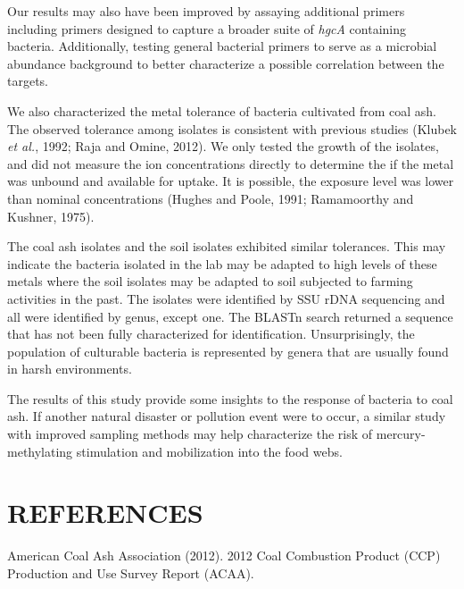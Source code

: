 \documentclass[ms, hidelinks]{uncgdissertationexp}
\theoremstyle{plain}
\theoremstyle{definition}
\theoremstyle{remark}
\begin{document}
Our results may also have been improved by assaying additional primers including primers designed to capture a broader suite of \emph{hgcA} containing bacteria. Additionally, testing general bacterial primers to serve as a microbial abundance background to better characterize a possible correlation between the targets.

We also characterized the metal tolerance of bacteria cultivated from coal ash. The observed tolerance among isolates is consistent with previous studies (Klubek \emph{et al.}, 1992; Raja and Omine, 2012). We only tested the growth of the isolates, and did not measure the ion concentrations directly to determine the if the metal was unbound and available for uptake. It is possible, the exposure level was lower than nominal concentrations (Hughes and Poole, 1991; Ramamoorthy and Kushner, 1975).

The coal ash isolates and the soil isolates exhibited similar tolerances. This may indicate the bacteria isolated in the lab may be adapted to high levels of these metals where the soil isolates may be adapted to soil subjected to farming activities in the past. The isolates were identified by SSU rDNA sequencing and all were identified by genus, except one. The BLASTn search returned a sequence that has not been fully characterized for identification. Unsurprisingly, the population of culturable bacteria is represented by genera that are usually found in harsh environments.

The results of this study provide some insights to the response of bacteria to coal ash. If another natural disaster or pollution event were to occur, a similar study with improved sampling methods may help characterize the risk of mercury-methylating stimulation and mobilization into the food webs.

\backmatter

\hypertarget{references}{%
\chapter{REFERENCES}\label{references}}

\noindent

\setlength{\parindent}{-0.20in}
\setlength{\leftskip}{0.20in}
\setlength{\parskip}{8pt}

\hypertarget{refs}{}
\leavevmode\hypertarget{ref-americancoalashassociation2012CoalCombustion2012}{}%
American Coal Ash Association (2012). 2012 Coal Combustion Product (CCP) Production and Use Survey Report (ACAA).
\end{document}
